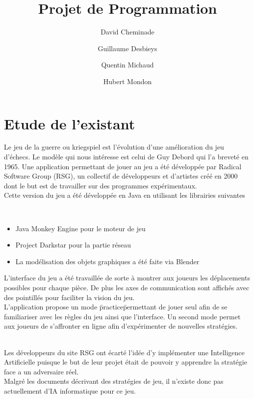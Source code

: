 \documentclass[12pt]{article}
\begin{document}
	\title{Projet de Programmation}
	\author{David Cheminade\and Guillaume Desbieys\and Quentin Michaud\and Hubert Mondon}
	\date{}
	\maketitle

	\let\thefootnote\relax

	\section{Etude de l'existant}

		Le jeu de la guerre ou kriegspiel est l'évolution d'une amélioration du jeu d'échecs.
		Le modèle qui nous intéresse est celui de Guy Debord qui l'a breveté en 1965.
		Une application permettant de jouer au jeu a été développée par Radical Software Group (RSG), un collectif de développeurs et d'artistes créé en 2000 dont le but est de travailler sur des programmes expérimentaux.\\[1\baselineskip]
		Cette version du jeu a été développée en Java en utilisant les librairies suivantes

		~~\\

		\begin{itemize}
			\item Java Monkey Engine pour le moteur de jeu
			\item Project Darkstar pour la partie réseau
			\item La modélisation des objets graphiques a été faite via Blender
			~~\\
		\end{itemize}

		L'interface du jeu a été travaillée de sorte à montrer aux joueurs les déplacements possibles pour chaque pièce. De plus les axes de communication sont affichés avec des pointillés pour faciliter la vision du jeu.\\[1\baselineskip]
		L'application propose un mode \"practice\" permettant de jouer seul afin de se familiariser avec les règles du jeu ainsi que l'interface.
		Un second mode permet aux joueurs de s'affronter en ligne afin d'expérimenter de nouvelles stratégies.

		~~\\
		Les développeurs du site RSG ont écarté l'idée d'y implémenter une Intelligence Artificielle puisque le but de leur projet était de pouvoir y apprendre la stratégie face a un adversaire réel.\\[1\baselineskip]
		Malgré les documents décrivant des stratégies de jeu, il n'existe donc pas actuellement d'IA informatique pour ce jeu.
\end{document}

